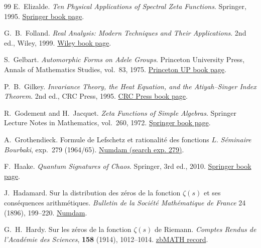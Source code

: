 \documentclass{article}
\numberwithin{equation}{section}
\theoremstyle{plain}
\theoremstyle{definition}
\theoremstyle{remark}
\begin{document}
\begin{thebibliography}{99}
E.~Elizalde.
\newblock \emph{Ten Physical Applications of Spectral Zeta Functions}.
\newblock Springer, 1995.
\newblock \href{https://link.springer.com/book/10.1007/978-3-642-79123-2}{Springer book page}.

G.~B.~Folland.
\newblock \emph{Real Analysis: Modern Techniques and Their Applications}.
\newblock 2nd ed., Wiley, 1999.
\newblock \href{https://www.wiley.com/en/Real%2BAnalysis%3A%2BModern%2BTechniques%2Band%2BTheir%2BApplications%2C%2B2nd%2BEdition-p-9780471317166}{Wiley book page}.

S.~Gelbart.
\newblock \emph{Automorphic Forms on Adele Groups}.
\newblock Princeton University Press, Annals of Mathematics Studies, vol.~83, 1975.
\newblock \href{https://press.princeton.edu/books/paperback/9780691081564/automorphic-forms-on-adele-groups}{Princeton UP book page}.

P.~B.~Gilkey.
\newblock \emph{Invariance Theory, the Heat Equation, and the Atiyah--Singer Index Theorem}.
\newblock 2nd ed., CRC Press, 1995.
\newblock \href{https://www.routledge.com/Invariance-Theory-The-Heat-Equation-and-the-Atiyah-Singer-Index-Theorem/Gilkey/p/book/9780849378744}{CRC Press book page}.


R.~Godement and H.~Jacquet.
\newblock \emph{Zeta Functions of Simple Algebras}.
\newblock Springer Lecture Notes in Mathematics, vol.~260, 1972.
\newblock \href{https://link.springer.com/book/10.1007/BFb0063308}{Springer book page}.

A.~Grothendieck.
\newblock Formule de Lefschetz et rationalit\'e des fonctions $L$.
\newblock \emph{S\'eminaire Bourbaki}, exp.~279 (1964/65).
\newblock \href{https://www.numdam.org/}{Numdam (search exp. 279)}.

F.~Haake.
\newblock \emph{Quantum Signatures of Chaos}.
\newblock Springer, 3rd ed., 2010.
\newblock \href{https://link.springer.com/book/10.1007/978-3-642-05428-3}{Springer book page}.

J.~Hadamard.
\newblock Sur la distribution des z\'eros de la fonction $\zeta(s)$ et ses cons\'equences arithm\'etiques.
\newblock \emph{Bulletin de la Soci\'et\'e Math\'ematique de France} 24 (1896), 199--220.
\newblock \href{https://www.numdam.org/item/BSMF_1896__24__199_1/}{Numdam}.

G.~H.~Hardy.
\newblock Sur les z\'eros de la fonction $\zeta(s)$ de Riemann.
\newblock \emph{Comptes Rendus de l'Acad\'emie des Sciences}, \textbf{158} (1914), 1012--1014.
\newblock \href{https://zbmath.org/?q=an:45.0332.02}{zbMATH record}.



\end{thebibliography}
\end{document}
